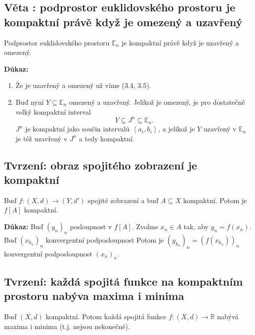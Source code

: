 \documentclass[../main.tex]{subfiles}
\begin{document}
\newpage
\subsection{Věta : podprostor euklidovského prostoru je kompaktní právě když je omezený a uzavřený}
\hspace{1.2mm}
\noindent
Podprostor euklidovského prostoru $\mathbb{E}_n$ je kompaktní právě když je uzavřený a omezený.

\vspace{5mm}
\noindent
\textbf{Důkaz:} 
\begin{enumerate}
    \item Že je uzavřený a omezený už víme (3.4, 3.5).
    \item Buď nyní $Y \subseteq \mathbb{E}_n$ omezený a uzavřený. Jelikož je omezený, je pro dostatečně velký kompaktní interval
    \[Y \subseteq J^n \subseteq \mathbb{E}_n.\]
    $J^n$ je kompaktní jako součin intervalů $\left<a_i,b_i\right>$, a jelikož je $Y$ uzavřený v $\mathbb{E}_n$ je též uzavřený
    v $J^n$ a tedy kompaktní.
\end{enumerate}

\subsection{Tvrzení: obraz spojitého zobrazení je kompaktní}
\hspace{1.2mm}
\noindent
Buď $f: (X,d) \to (Y, d')$ spojité zobrazení a buď $A \subseteq X$ kompaktní. Potom je $f[A]$ kompaktní.


\vspace{5mm}
\noindent
\textbf{Důkaz:} Buď $(y_n)_n$ posloupnost v $f[A]$. Zvolme $x_n \in A$ tak, aby $y_n = f(x_n)$. Buď $(x_{k_n})_n$ konvergentní podposloupnost
Potom je $(y_{k_n})_n = (f(x_{k_n}))_n$ konvergentní podposloupnost $(x_n)_n$.

\subsection{Tvrzení: každá spojitá funkce na kompaktním prostoru nabýva maxima i minima}
\hspace{1.2mm}
\noindent
Buď $(X,d)$ kompaktní. Potom každá spojitá funkce $f:(X,d)\to \mathbb{R}$ nabývá maxima i minima (t.j. nejsou nekonečné).
\end{document}
